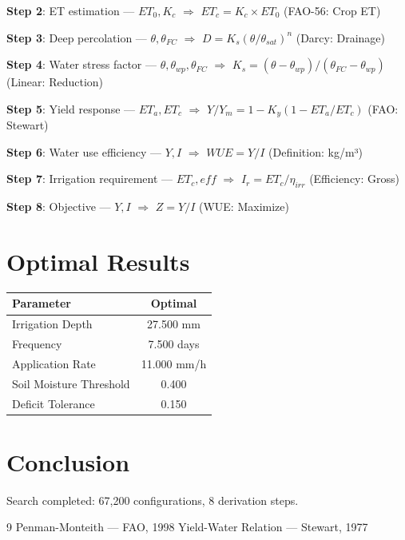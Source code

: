 \documentclass[11pt,twocolumn]{article}
\begin{document}
\textbf{Step 2}: ET estimation --- $ET_0, K_c$ $\Rightarrow$ $ET_c = K_c \times ET_0$ (FAO-56: Crop ET)


\textbf{Step 3}: Deep percolation --- $\theta, \theta_{FC}$ $\Rightarrow$ $D = K_s (\theta/\theta_{sat})^n$ (Darcy: Drainage)


\textbf{Step 4}: Water stress factor --- $\theta, \theta_{wp}, \theta_{FC}$ $\Rightarrow$ $K_s = (\theta - \theta_{wp})/(\theta_{FC} - \theta_{wp})$ (Linear: Reduction)


\textbf{Step 5}: Yield response --- $ET_a, ET_c$ $\Rightarrow$ $Y/Y_m = 1 - K_y(1 - ET_a/ET_c)$ (FAO: Stewart)


\textbf{Step 6}: Water use efficiency --- $Y, I$ $\Rightarrow$ $WUE = Y/I$ (Definition: kg/m³)


\textbf{Step 7}: Irrigation requirement --- $ET_c, eff$ $\Rightarrow$ $I_r = ET_c / \eta_{irr}$ (Efficiency: Gross)


\textbf{Step 8}: Objective --- $Y, I$ $\Rightarrow$ $Z = Y/I$ (WUE: Maximize)


\section{Optimal Results}
\begin{table}[h]
\centering
\begin{tabular}{@{}lc@{}}
\toprule
Parameter & Optimal \\
\midrule
Irrigation Depth & 27.500 mm \\
Frequency & 7.500 days \\
Application Rate & 11.000 mm/h \\
Soil Moisture Threshold & 0.400  \\
Deficit Tolerance & 0.150  \\
\bottomrule
\end{tabular}
\end{table}

\section{Conclusion}
Search completed: 67,200 configurations, 8 derivation steps.

\begin{thebibliography}{9}
 Penman-Monteith --- FAO, 1998
 Yield-Water Relation --- Stewart, 1977
\end{thebibliography}
\end{document}
